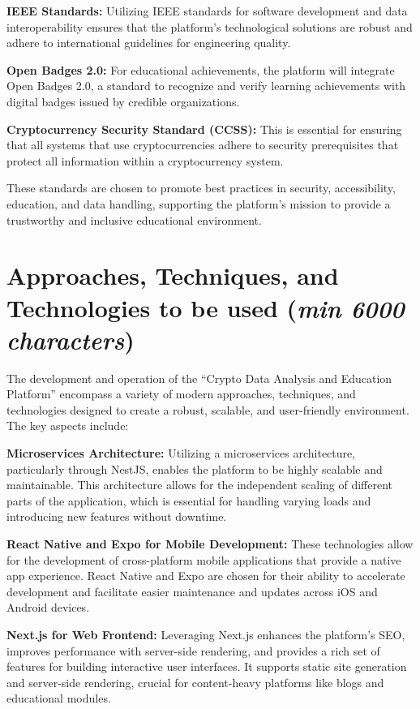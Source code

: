 \documentclass[12pt]{report}
\newcommand{\characters}[1]{(\textit{min #1 characters})}
\begin{document}
\textbf{IEEE Standards:} Utilizing IEEE standards for software development and data interoperability ensures that the platform's technological solutions are robust and adhere to international guidelines for engineering quality.

\textbf{Open Badges 2.0:} For educational achievements, the platform will integrate Open Badges 2.0, a standard to recognize and verify learning achievements with digital badges issued by credible organizations.

\textbf{Cryptocurrency Security Standard (CCSS):} This is essential for ensuring that all systems that use cryptocurrencies adhere to security prerequisites that protect all information within a cryptocurrency system.

These standards are chosen to promote best practices in security, accessibility, education, and data handling, supporting the platform’s mission to provide a trustworthy and inclusive educational environment.

\section{Approaches, Techniques, and Technologies to be used \characters{6000}}
The development and operation of the ``Crypto Data Analysis and Education Platform'' encompass a variety of modern approaches, techniques, and technologies designed to create a robust, scalable, and user-friendly environment. The key aspects include:

\textbf{Microservices Architecture:} Utilizing a microservices architecture, particularly through NestJS, enables the platform to be highly scalable and maintainable. This architecture allows for the independent scaling of different parts of the application, which is essential for handling varying loads and introducing new features without downtime.

\textbf{React Native and Expo for Mobile Development:} These technologies allow for the development of cross-platform mobile applications that provide a native app experience. React Native and Expo are chosen for their ability to accelerate development and facilitate easier maintenance and updates across iOS and Android devices.

\textbf{Next.js for Web Frontend:} Leveraging Next.js enhances the platform's SEO, improves performance with server-side rendering, and provides a rich set of features for building interactive user interfaces. It supports static site generation and server-side rendering, crucial for content-heavy platforms like blogs and educational modules.
\end{document}
